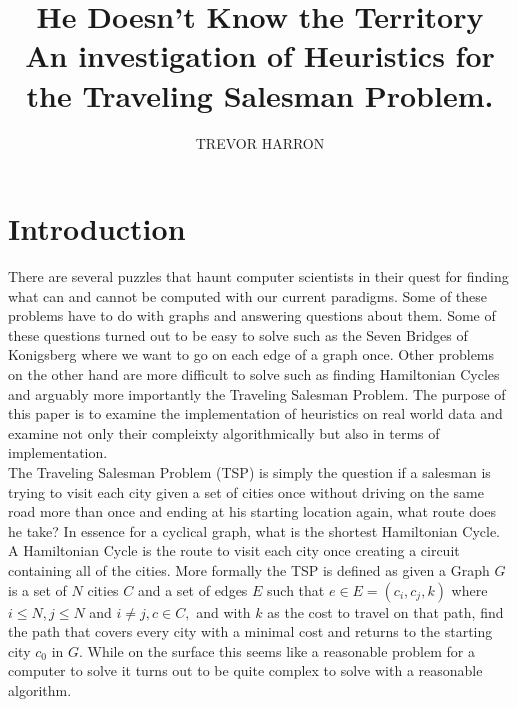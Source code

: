 \documentclass[midd]{thesis}
\title{He Doesn't Know the Territory\\
\small{An investigation of Heuristics for the Traveling Salesman Problem.}}
\author{TREVOR HARRON}
\newcommand{\tab}{\hspace*{2em}}
\begin{document}
\maketitle

\contentspage

\chapter{Introduction}
\tab There are several puzzles that haunt computer scientists in their quest for finding what can and cannot be computed with our current paradigms. Some of these problems have to do with graphs and answering questions about them. Some of these questions turned out to be easy to solve such as the Seven Bridges of Konigsberg where we want to go on each edge of a graph once. Other problems on the other hand are more difficult to solve such as finding Hamiltonian Cycles and arguably more importantly the Traveling Salesman Problem. The purpose of this paper is to examine the implementation of heuristics on real world data and examine not only their compleixty algorithmically but also in terms of implementation.\\
\tab The Traveling Salesman Problem (TSP) is simply the question if a salesman is trying to visit each city given a set of cities once without driving on the same road more than once and ending at his starting location again, what route does he take? In essence for a cyclical graph, what is the shortest Hamiltonian Cycle. A Hamiltonian Cycle is the route to visit each city once creating a circuit containing all of the cities. More formally the TSP is defined as given a Graph $G$ is a set of $N$ cities $C$ and a set of edges $E$ such that $e \in E = (c_{i}, c_{j},k)$ where $i \le N, j \le N$ and $i \ne j, c \in C,$ and with $k$ as the cost to travel on that path, find the path that covers every city with a minimal cost and returns to the starting city $c_{0}$ in $G$. While on the surface this seems like  a reasonable problem for a computer to solve it turns out to be quite complex to solve with a reasonable algorithm.\\
\end{document}
